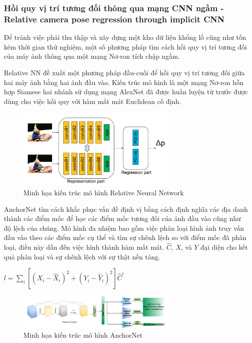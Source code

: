 \subsubsection*{Hồi quy vị trí tương đối thông qua mạng CNN ngầm - Relative camera pose regression through implicit CNN}
Để tránh việc phải thu thập và xây dựng một kho dữ liệu khổng lồ cũng như tốn kém thời gian thử nghiệm, một số phương pháp tìm cách hồi quy vị trí tương đối của máy ảnh thông qua một mạng Nơ-ron tích chập ngầm.

Relative NN \cite{melekhov2017relative} đề xuất một phương pháp đầu-cuối để hồi quy vị trí tương đối giữa hai máy ảnh bằng hai ảnh đầu vào. Kiến trúc mô hình là một mạng Nơ-ron hỗn hợp Siamese hai nhánh sử dụng mạng AlexNet đã được huấn luyện từ trước được dùng cho việc hồi quy với hàm mất mát Euclidean cố định.
\begin{figure}[H]
    \centering
    \includegraphics[width=0.7\textwidth]{pics/Chapter2/relativenn.png}
    \caption{Minh họa kiến trúc mô hình Relative Neural Network \cite{melekhov2017relative}}
\end{figure}
AnchorNet \cite{saha2018improved} tìm cách khắc phục vấn đề định vị bằng cách định nghĩa các địa danh thành các điểm mốc để học các điểm mốc tương đối của ảnh đầu vào cũng như độ lệch của chúng. Mô hình đa nhiệm bao gồm việc phân loại hình ảnh truy vấn đầu vào theo các điểm mốc cụ thể và tìm sự chênh lệch so với điểm mốc đã phân loại, điều này dẫn đến việc hình thành hàm mất mát. $\hat{C}$, $X$, và $Y$ đại diện cho kết quả phân loại và sự chênh lệch với sự thật nền tảng.
\begin{center}
    $l = \sum_i[(X_i - \hat{X}_i)^2 + (Y_i - \hat{Y}_i)^2]\hat{C}^i$
\end{center}
\begin{figure}[H]
    \centering
    \includegraphics[width=0.7\textwidth]{pics/Chapter2/anchornet.png}
    \caption{Minh họa kiến trúc mô hình AnchorNet \cite{saha2018improved}}
\end{figure}

